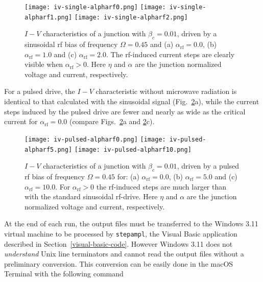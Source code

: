 \begin{figure}[tb]
{
	\fboxsep=0pt
	\mbox{\texttt{[image: iv-single-alpharf0.png]}}
	\hfill
	\mbox{\texttt{[image: iv-single-alpharf1.png]}}
	\hfill
	\mbox{\texttt{[image: iv-single-alpharf2.png]}}
}
	\caption{$I - V$ characteristics of a junction with $\beta_c = 0.01$, driven by a sinusoidal rf bias of frequency $\Omega = 0.45$ and (a) $\alpha_\mathrm{rf} = 0.0$, (b) $\alpha_\mathrm{rf} = 1.0$ and (c) $\alpha_\mathrm{rf} = 2.0$. The rf-induced current steps are clearly visible when $\alpha_\mathrm{rf} > 0$. Here $\eta$ and $\alpha$ are the junction normalized voltage and current, respectively.}
	\label{fig:iv-single}
\end{figure}


For a pulsed drive, the $I - V$ characteristic without microwave radiation is identical to that calculated with the sinusoidal signal (Fig.~\ref{fig:iv-pulsed}a), while the current steps induced by the pulsed drive are fewer and nearly as wide as the critical current for $\alpha_\mathrm{rf} = 0.0$ (compare Figs.~\ref{fig:iv-pulsed}a and \ref{fig:iv-pulsed}c).

\begin{figure}[tb]
{
	\fboxsep=0pt
	\mbox{\texttt{[image: iv-pulsed-alpharf0.png]}}
	\hfill
	\mbox{\texttt{[image: iv-pulsed-alpharf5.png]}}
	\hfill
	\mbox{\texttt{[image: iv-pulsed-alpharf10.png]}}
}
	\caption{$I - V$ characteristics of a junction with $\beta_c = 0.01$, driven by a pulsed rf bias of frequency $\Omega = 0.45$ for: (a) $\alpha_\mathrm{rf} = 0.0$, (b) $\alpha_\mathrm{rf} = 5.0$ and (c) $\alpha_\mathrm{rf} = 10.0$. For $\alpha_\mathrm{rf} > 0$ the rf-induced steps are much larger than with the standard sinusoidal rf-drive. Here $\eta$ and $\alpha$ are the junction normalized voltage and current, respectively.}
	\label{fig:iv-pulsed}
\end{figure}


At the end of each run, the output files must be transferred to the Windows 3.11 virtual machine to be processed by \texttt{stepampl}, the Visual Basic application described in Section~\ref{visual-basic-code}. However Windows 3.11 does not \emph{understand} Unix line terminators and cannot read the output files without a preliminary conversion. 
This conversion can be easily done in the macOS Terminal with the following command

